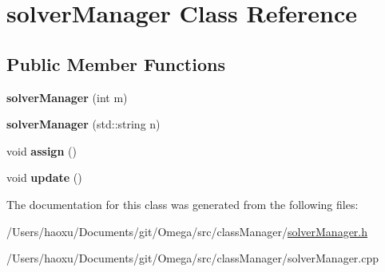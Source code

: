\hypertarget{classsolver_manager}{}\section{solver\+Manager Class Reference}
\label{classsolver_manager}
\subsection*{Public Member Functions}
\begin{DoxyCompactItemize}
\item 
\mbox{\label{classsolver_manager_a4b54a1ebc362bb24bf3bad19ecd4dfc9}} 
{\bfseries solver\+Manager} (int m)
\item 
\mbox{\label{classsolver_manager_af8f807bfa004a9cdc9adf3febd467173}} 
{\bfseries solver\+Manager} (std\+::string n)
\item 
\mbox{\label{classsolver_manager_af748e8337f584a287021659236ce0946}} 
void {\bfseries assign} ()
\item 
\mbox{\label{classsolver_manager_a96e9e5db3a690dcfec3428f4deca2a5b}} 
void {\bfseries update} ()
\end{DoxyCompactItemize}


The documentation for this class was generated from the following files\+:\begin{DoxyCompactItemize}
\item 
/\+Users/haoxu/\+Documents/git/\+Omega/src/class\+Manager/\hyperlink{solver_manager_8h}{solver\+Manager.\+h}\item 
/\+Users/haoxu/\+Documents/git/\+Omega/src/class\+Manager/solver\+Manager.\+cpp\end{DoxyCompactItemize}
